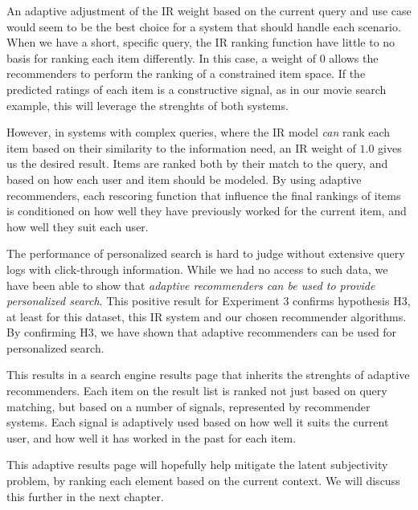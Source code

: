 An adaptive adjustment of the IR weight based on the current query and use case
would seem to be the best choice for a system that should handle each scenario.
When we have a short, specific query, the IR ranking function have little to
no basis for ranking each item differently.
In this case, a weight of $0$ allows the recommenders to perform the ranking
of a constrained item space.
If the predicted ratings of each item is a constructive signal,
as in our movie search example, this will leverage the strenghts of both systems.

However, in systems with complex queries, where the IR model
\emph{can} rank each item based on their similarity to the information need,
an IR weight of $1.0$ gives us the desired result.
Items are ranked both by their match to the query,
and based on how each user and item should be modeled.
By using adaptive recommenders, each rescoring function
that influence the final rankings of items is conditioned
on how well they have previously worked for the current item,
and how well they suit each user.

The performance of personalized search is hard to judge without
extensive query logs with click-through information.
While we had no access to such data, 
we have been able to show that \emph{adaptive recommenders
can be used to provide personalized search}.
This positive result for Experiment 3 confirms hypothesis H3,
at least for this dataset, this IR system and our chosen recommender algorithms.
By confirming H3, we have shown that adaptive recommenders can be used for personalized search.

This results in a search engine results page that inherits the strenghts of adaptive recommenders.
Each item on the result list is ranked not just based on query matching,
but based on a number of signals, represented by recommender systems.
Each signal is adaptively used based on how well it suits the current user,
and how well it has worked in the past for each item.

This adaptive results page will hopefully help mitigate the latent subjectivity problem,
by ranking each element based on the current context.
We will discuss this further in the next chapter.


